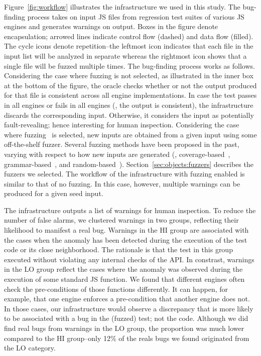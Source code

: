 \documentclass[10pt,conference,anonymous]{IEEEtran}
\begin{document}
Figure~\ref{fig:workflow} illustrates the infrastructure we used in
this study.
The bug-finding process
takes on input JS files from regression test suites of various JS
engines and generates warnings on output. Boxes in the figure denote encapsulation;
arrowed lines indicate control flow (dashed) and data flow
(filled). The cycle icons denote repetition--the leftmost icon
indicates that each file in the input list will be analyzed in
separate whereas the rightmost icon shows that a single file will be
fuzzed multiple times. The bug-finding process works as follows.  Considering the case
where fuzzing is not selected, as illustrated in the inner box at the bottom
of the figure, the oracle checks whether or not the output produced
for that file is consistent across all engine implementations. In case
the test passes in all engines or fails in all engines (\ie{}, the
output is consistent), the infrastructure discards the corresponding
input. Otherwise, it considers the input as potentially
fault-revealing; hence interesting for human inspection. Considering
the case where fuzzing~\cite{fuzz-testing-history} is selected, new
inputs are obtained from a given input using some off-the-shelf
fuzzer. Several fuzzing methods have been proposed in the
  past, varying with respect to how new inputs are generated (\eg{},
  coverage-based~\cite{afl,honggfuzz},
  grammar-based~\cite{grammarinator,jsfunfuzz}, and
  random-based~\cite{radamsa}). Section~\ref{sec:objects:fuzzers} describes the
  fuzzers we selected. The workflow of the infrastructure with fuzzing
  enabled is similar to that of no fuzzing. In this case, however, multiple warnings can be produced
for a given seed input.

The infrastructure outputs a list of warnings for human inspection.
To reduce the number of false alarms, we clustered warnings in two
groups, reflecting their likelihood to manifest a real bug. Warnings
in the HI group are associated with the cases when the anomaly has been
detected during the execution of the test code or its close neighborhood. The rationale is that
the test in this group executed without violating any internal checks
of the API. In constrast, warnings in the LO group reflect the cases where the
anomaly was observed during the execution of some standard JS
function. We
found that different engines often check the pre-conditions of those
functions differently. It can happen, for example, that one engine
enforces a pre-condition that another engine does not. In those cases,
our infrastructure would observe a discrepancy that is more likely to
be associated with a bug in the (fuzzed) test; not the code. Although
we did find real bugs from warnings in the LO group, the proportion
was much lower compared to the HI group--only 12\% of the reals bugs
we found originated from the LO category. 
\end{document}
